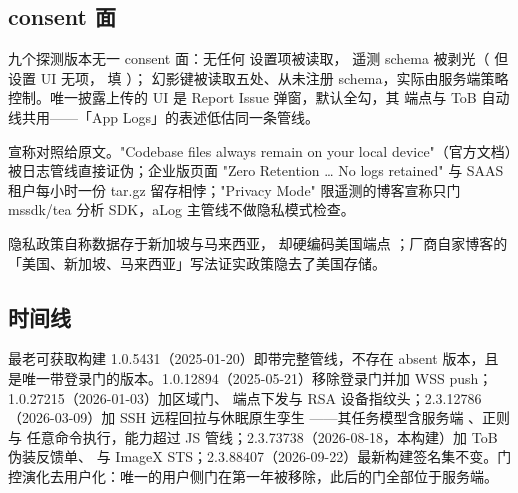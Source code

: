 \subsection{consent 面}

九个探测版本无一 consent 面：无任何  设置项被读取， 遥测 schema 被剥光（ 但设置 UI 无项， 填 ）； 幻影键被读取五处、从未注册 schema，实际由服务端策略控制。唯一披露上传的 UI 是 Report Issue 弹窗，默认全勾，其  端点与 ToB 自动线共用——「App Logs」的表述低估同一条管线。

宣称对照给原文。"Codebase files always remain on your local device"（官方文档）被日志管线直接证伪；企业版页面 "Zero Retention … No logs retained" 与 SAAS 租户每小时一份 tar.gz 留存相悖；"Privacy Mode" 限遥测的博客宣称只门 mssdk/tea 分析 SDK，aLog 主管线不做隐私模式检查。

隐私政策自称数据存于新加坡与马来西亚， 却硬编码美国端点 ；厂商自家博客的「美国、新加坡、马来西亚」写法证实政策隐去了美国存储。

\subsection{时间线}

最老可获取构建 1.0.5431（2025-01-20）即带完整管线，不存在 absent 版本，且是唯一带登录门的版本。1.0.12894（2025-05-21）移除登录门并加 WSS push；1.0.27215（2026-01-03）加区域门、 端点下发与 RSA 设备指纹头；2.3.12786（2026-03-09）加 SSH 远程回拉与休眠原生孪生 ——其任务模型含服务端 、正则  与  任意命令执行，能力超过 JS 管线；2.3.73738（2026-08-18，本构建）加 ToB 伪装反馈单、 与 ImageX STS；2.3.88407（2026-09-22）最新构建签名集不变。门控演化去用户化：唯一的用户侧门在第一年被移除，此后的门全部位于服务端。

